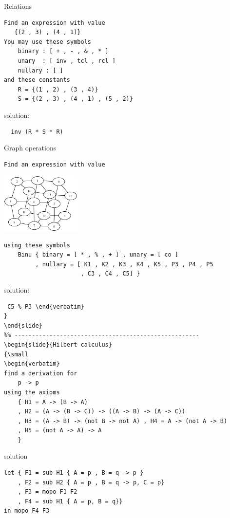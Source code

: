 \begin{slide}{Relations}
\begin{verbatim}
Find an expression with value
   {(2 , 3) , (4 , 1)}
You may use these symbols
    binary : [ + , - , & , * ]
    unary  : [ inv , tcl , rcl ]
    nullary : [ ]
and these constants
    R = {(1 , 2) , (3 , 4)}
    S = {(2 , 3) , (4 , 1) , (5 , 2)}
\end{verbatim}

solution: \begin{verbatim}  inv (R * S * R) \end{verbatim}

\end{slide}
\begin{slide}{Graph operations}
{\small 
\begin{verbatim}  
Find an expression with value
\end{verbatim}
\begin{minipage}{0.4\textwidth}
\includegraphics[width=4cm]{mathgrundbild.eps}
\end{minipage}%

\begin{verbatim}  
using these symbols
    Binu { binary = [ * , % , + ] , unary = [ co ]
         , nullary = [ K1 , K2 , K3 , K4 , K5 , P3 , P4 , P5 
                      , C3 , C4 , C5] }
\end{verbatim}

solution: \begin{verbatim} C5 % P3 \end{verbatim}
}
\end{slide}
\begin{slide}{Hilbert calculus}
{\small
\begin{verbatim}
find a derivation for
    p -> p
using the axioms
    { H1 = A -> (B -> A)
    , H2 = (A -> (B -> C)) -> ((A -> B) -> (A -> C))
    , H3 = (A -> B) -> (not B -> not A) , H4 = A -> (not A -> B)
    , H5 = (not A -> A) -> A
    }
\end{verbatim}
solution
\begin{verbatim}
let { F1 = sub H1 { A = p , B = q -> p }
    , F2 = sub H2 { A = p , B = q -> p, C = p}
    , F3 = mopo F1 F2
    , F4 = sub H1 { A = p, B = q}}
in mopo F4 F3
\end{verbatim}
}
\end{slide}
